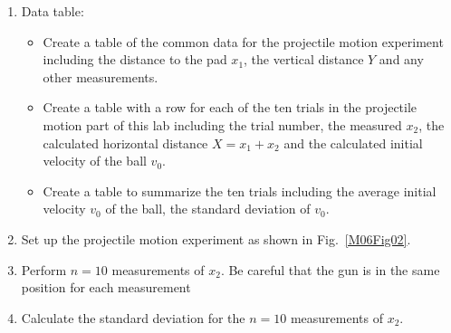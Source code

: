 \begin{enumerate}
\item Data table:
\begin{itemize}
\item Create a table of the common data for the projectile motion experiment including the distance to the pad $x_1$, the vertical distance $Y$ and any other measurements.
\item Create a table with a row for each of the ten trials in the projectile motion part of this lab including the trial number, the measured $x_2$, the calculated horizontal distance $X=x_1+x_2$ and the calculated initial velocity of the ball $v_0$.
\item Create a table to summarize the ten trials including the average initial velocity $v_0$ of the ball, the standard deviation of $v_0$.%
\end{itemize}
\item Set up the projectile motion experiment as shown in Fig.~\ref{M06Fig02}.
\item Perform $n=10$ measurements of $x_2$. Be careful that the gun is in the same position for each measurement
\item Calculate the standard deviation for the $n=10$ measurements of $x_2$.
\end{enumerate}






